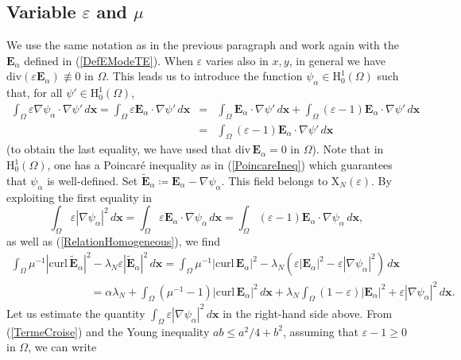 \documentclass[11pt,a4paper]{article}
\newcommand{\dsp}{\displaystyle}
\newcommand{\eps}{\varepsilon}
\newcommand{\Om}{\Omega}
\newcommand{\mrm}[1]{\mathrm{#1}}
\newcommand{\bfx}{\boldsymbol{x}}
\newcommand{\mH}{\mrm{H}}
\newcommand{\mX}{\mrm{X}}
\newcommand{\curlvec}{\boldsymbol{\mrm{curl}}\,}
\renewcommand{\div}{\mrm{div}}
\def\E{\boldsymbol{E}}
\begin{document}
\subsection{Variable $\eps$ and $\mu$}

We use the same notation as in the previous paragraph and work again with the $\E_\alpha$ defined in (\ref{DefEModeTE}). When $\eps$ varies also in $x,y$, in general we have $\div(\eps\E_\alpha)\not\equiv0$ in $\Om$. This leads us to introduce the function $\psi_\alpha\in\mH^1_0(\Om)$ such that, for all $\psi'\in\mH^1_0(\Om)$,
\begin{equation}\label{DefPsiVariableDouble}
\begin{array}{rcl}
\dsp\int_\Om \eps\nabla\psi_\alpha\cdot\nabla\psi'\,d\bfx=\int_\Om \eps\E_\alpha\cdot\nabla\psi'\,d\bfx&=&\dsp\int_\Om\E_\alpha\cdot\nabla\psi'\,d\bfx+\int_\Om(\eps-1)\E_\alpha\cdot\nabla\psi'\,d\bfx\\[10pt]
&=&\dsp\int_\Om(\eps-1)\E_\alpha\cdot\nabla\psi'\,d\bfx
\end{array}
\end{equation}
 (to obtain the last equality, we have used that $\div\,\E_\alpha=0$ in $\Om$). Note that in $\mH^1_0(\Om)$, one has a Poincar\'e inequality as in (\ref{PoincareIneq}) which guarantees that $\psi_\alpha$ is well-defined. Set $\tilde{\E}_\alpha\coloneqq\E_\alpha-\nabla\psi_\alpha$. This field belongs to $\boldsymbol{\mX}_N(\eps)$. By exploiting the first equality in
\begin{equation}\label{TermeCroise}
\int_\Om \eps|\nabla\psi_\alpha|^2\,d\bfx=\int_\Om \eps\E_\alpha\cdot\nabla\psi_\alpha\,d\bfx=\int_\Om(\eps-1)\E_\alpha\cdot\nabla\psi_\alpha\,d\bfx,
\end{equation}
as well as (\ref{RelationHomogeneous}), we find
\begin{equation}\label{TermDecompoVaria}
\begin{array}{c}
\dsp\int_\Om \mu^{-1}|\curlvec\tilde{\E}_\alpha|^2-\lambda_N\eps|\tilde{\E}_\alpha|^2\,d\bfx=\dsp\int_\Om \mu^{-1}|\curlvec\E_\alpha|^2-\lambda_N(\eps|\E_\alpha|^2-\eps|\nabla\psi_\alpha|^2)\,d\bfx\\[10pt]
\hspace{3cm}=\dsp\alpha\lambda_N+\int_\Om (\mu^{-1}-1)|\curlvec\E_\alpha|^2\,d\bfx+\lambda_N\dsp\int_\Om (1-\eps)|\E_\alpha|^2+\eps|\nabla\psi_\alpha|^2\,d\bfx.
\end{array}
\end{equation}
Let us estimate the quantity $\int_{\Om}\eps|\nabla\psi_\alpha|^2\,d\bfx$ in the right-hand side above. From (\ref{TermeCroise}) and the Young inequality $ab\le a^2/4+b^2$, assuming that $\eps-1\ge0$ in $\Om$, we can write
\end{document}

